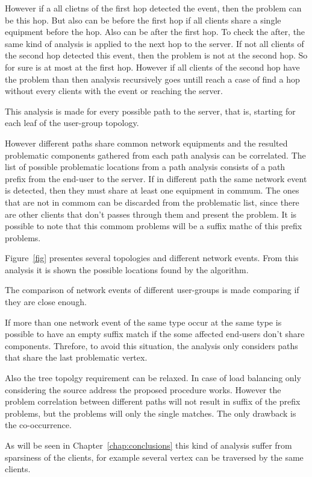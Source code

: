 However if a all clietns of the first hop detected the event, then the  problem
can be this hop. But also can be before the first hop if all clients share a
single equipment before the hop. Also can be after the first hop. To check the
after, the same kind of analysis is applied to the next hop to the server. If
not all clients of the second hop detected this event, then the problem is not
at the second hop. So for sure is at most at the first hop. However if all
clients of the second hop have the problem than then analysis recursively goes
untill reach a case of find a hop without every clients with the event or
reaching the server.

This analysis is made for every possible path to the server, that is, starting
for each leaf of the user-group topology.

However different paths share common network equipments and the resulted
problematic components gathered from each path analysis can be correlated. The
list of possible problematic locations from a path analysis consists of a path
prefix from the end-user to the server. If in different path the same network
event is detected, then they must share at least one equipment in commum. The
ones that are not in commom can be discarded from the problematic list, since
there are other clients that don't passes through them and present the problem.
It is possible to note that this commom problems will be a suffix mathc of this
prefix problems.

Figure~\ref{fig} presentes several topologies and different network events.
From this analysis it is shown the possible locations found by the algorithm.

The comparison of network events of different user-groups is made comparing if
they are close enough.

If more than one network event of the same type occur at the same type is
possible to have an empty suffix match if the some affected end-users don't
share components. Threfore, to avoid this situation, the analysis only
considers paths that share the last problematic vertex.

Also the tree topolgy requirement can be relaxed. In case of load balancing
only considering the source address the proposed procedure works. However the
problem correlation between different paths will not result in suffix of the
prefix problems, but the problems will only the single matches. The only
drawback is the co-occurrence.

As will be seen in Chapter~\ref{chap:conclusions} this kind of analysis suffer
from sparsiness of the clients, for example several vertex can be traversed by
the same clients.

